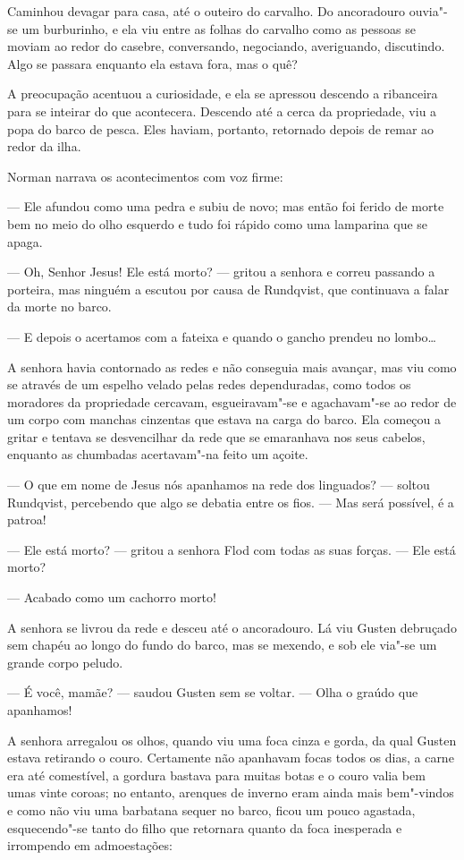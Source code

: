 Caminhou devagar para casa, até o outeiro do carvalho. Do ancoradouro ouvia"-se um
burburinho, e ela viu entre as folhas do carvalho como as pessoas
se moviam ao redor do casebre, conversando, negociando, averiguando,
discutindo. Algo se passara enquanto ela estava fora, mas o quê?

A preocupação acentuou a curiosidade, e ela se apressou descendo a ribanceira
para se inteirar do que acontecera. Descendo até a cerca da propriedade, viu a popa
do barco de pesca. Eles haviam, portanto, retornado depois de remar ao redor da ilha.

Norman narrava os acontecimentos com voz firme:

--- Ele afundou como uma pedra e subiu de novo; mas então foi ferido de morte bem
no meio do olho esquerdo e tudo foi rápido como uma lamparina que se apaga.

--- Oh, Senhor Jesus! Ele está morto? --- gritou a senhora e correu passando
a porteira, mas ninguém a escutou por causa de Rundqvist, que continuava a falar
da morte no barco.

--- E depois o acertamos com a fateixa e quando o gancho prendeu no lombo\ldots{}

A senhora havia contornado as redes e não conseguia mais avançar, mas viu como
se através de um espelho velado pelas redes dependuradas, como todos os
moradores da propriedade cercavam, esgueiravam"-se e agachavam"-se ao redor de um
corpo com manchas cinzentas que estava na carga do barco. Ela começou a gritar e
tentava se desvencilhar da rede que se emaranhava nos seus cabelos, enquanto as
chumbadas acertavam"-na feito um açoite.

--- O que em nome de Jesus nós apanhamos na rede dos linguados? --- soltou
Rundqvist, percebendo que algo se debatia entre os fios. --- Mas será possível, é
a patroa!

--- Ele está morto? --- gritou a senhora Flod com todas as suas forças. --- Ele está
morto?

--- Acabado como um cachorro morto!

A senhora se livrou da rede e desceu até o ancoradouro. Lá viu Gusten debruçado
sem chapéu ao longo do fundo do barco, mas se mexendo, e sob ele via"-se um
grande corpo peludo.

--- É você, mamãe? --- saudou Gusten sem se voltar. --- Olha o graúdo que
apanhamos!

A senhora arregalou os olhos, quando viu uma foca cinza e gorda, da qual Gusten
estava retirando o couro. Certamente não apanhavam focas todos os dias, a
carne era até comestível, a gordura bastava para muitas botas e o couro
valia bem umas vinte coroas; no entanto, arenques de inverno eram ainda mais
bem"-vindos e como não viu uma barbatana sequer no barco, ficou um pouco agastada,
esquecendo"-se tanto do filho que retornara quanto da foca inesperada e irrompendo em
admoestações:

